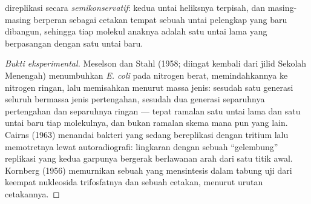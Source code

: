 \begin{proposition}\label{prop:b1:replication-mitosis:semiconservative}
 direplikasi secara \emph{semikonservatif}: kedua untai heliksnya
terpisah, dan masing-masing berperan sebagai cetakan tempat sebuah untai
pelengkap yang baru dibangun, sehingga tiap molekul anaknya adalah satu
untai lama yang berpasangan dengan satu untai baru.
\end{proposition}
\begin{proof}[Bukti eksperimental]
Meselson dan Stahl (1958; diingat kembali dari jilid Sekolah Menengah)
menumbuhkan \emph{E. coli} pada nitrogen berat, memindahkannya ke
nitrogen ringan, lalu memisahkan  menurut massa jenis: sesudah
satu generasi seluruh  bermassa jenis pertengahan, sesudah dua
generasi separuhnya pertengahan dan separuhnya ringan --- tepat ramalan
satu untai lama dan satu untai baru tiap molekulnya, dan bukan ramalan
skema mana pun yang lain. Cairns (1963) menandai  bakteri yang
sedang bereplikasi dengan tritium lalu memotretnya lewat autoradiografi:
lingkaran dengan sebuah ``gelembung'' replikasi yang kedua garpunya
bergerak berlawanan arah dari satu titik awal. Kornberg (1956) memurnikan
sebuah  yang mensintesis  dalam tabung uji dari keempat
nukleosida trifosfatnya dan sebuah cetakan, menurut urutan cetakannya.
\end{proof}


